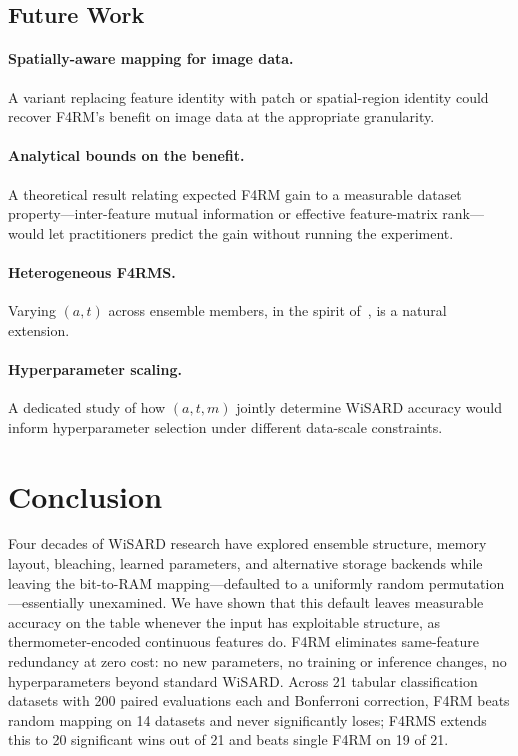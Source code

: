 \documentclass[runningheads]{llncs}
\begin{document}
\subsection{Future Work}
\label{sec:future-work}

\paragraph{Spatially-aware mapping for image data.} A variant replacing feature identity with patch or spatial-region identity could recover F4RM's benefit on image data at the appropriate granularity.

\paragraph{Analytical bounds on the benefit.} A theoretical result relating expected F4RM gain to a measurable dataset property---inter-feature mutual information or effective feature-matrix rank---would let practitioners predict the gain without running the experiment.

\paragraph{Heterogeneous F4RMS.} Varying $(a, t)$ across ensemble members, in the spirit of~\cite{susskind2023uleen}, is a natural extension.

\paragraph{Hyperparameter scaling.} A dedicated study of how $(a, t, m)$ jointly determine WiSARD accuracy would inform hyperparameter selection under different data-scale constraints.


\section{Conclusion}
\label{sec:conclusion}

Four decades of WiSARD research have explored ensemble structure, memory layout, bleaching, learned parameters, and alternative storage backends while leaving the bit-to-RAM mapping---defaulted to a uniformly random permutation---essentially unexamined. We have shown that this default leaves measurable accuracy on the table whenever the input has exploitable structure, as thermometer-encoded continuous features do. F4RM eliminates same-feature redundancy at zero cost: no new parameters, no training or inference changes, no hyperparameters beyond standard WiSARD. Across 21 tabular classification datasets with 200 paired evaluations each and Bonferroni correction, F4RM beats random mapping on 14 datasets and never significantly loses; F4RMS extends this to 20 significant wins out of 21 and beats single F4RM on 19 of 21.
\end{document}
